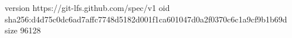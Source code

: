 version https://git-lfs.github.com/spec/v1
oid sha256:d4d75c0dc6ad7affc7748d5182d001f1ca601047d0a2f0370c6c1a9cf9b1b69d
size 96128

